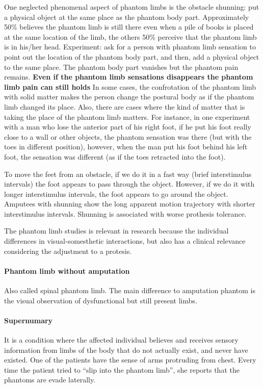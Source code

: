 \documentclass[12pt,article,oneside,a4paper]{memoir}
\begin{document}
One neglected phenomenal aspect of phantom limbs is the obstacle shunning: put
a physical object at the same place as the phantom body part. Approximately 50\%
believes the phantom limb is still there even when a pile of books is placed at
the same location of the limb, the others 50\% perceive that the phantom limb is
in his/her head. Experiment: ask for a person with phantom limb sensation to
point out the location of the phantom body part, and then, add a physical object
to the same place. The phantom body part vanishes but the phantom pain remains.
\textbf{Even if the phantom limb sensations disappears the phantom limb pain
can still holds} In some cases, the confrotation of the phantom limb with solid
matter makes the person change the postural body as if the phantom limb changed
its place. Also, there are cases where the kind of matter that is taking the
place of the phantom limb matters. For instance, in one experiment with a man
who lose the anterior part of his right foot, if he put his foot really close
to a wall or other objects, the phantom sensation was there (but with the toes
in different position), however, when the man put his foot behind his left foot,
the sensation was different (as if the toes retracted into the foot).

To move the feet from an obstacle, if we do it in a fast way (brief interstimulus
intervals) the foot appears to pass through the object. However, if we do it with
longer interstimulus intervals, the foot appears to go around the object.
Amputees with shunning show the long apparent motion trajectory with shorter
interstimulus intervals. Shunning is associated with worse prothesis tolerance.

The phantom limb studies is relevant in research because the individual
differences in visual-somesthetic interactions, but also has a clinical
relevance considering the adjustment to a protesis.

\paragraph{Phantom limb without amputation}
Also called spinal phantom limb. The main difference to amputation phantom is
the visual observation of dysfunctional but still present limbs. 

\paragraph{Supernumary}
It is a condition where the affected individual believes and receives sensory
information from limbs of the body that do not actually exist, and never have
existed. One of the patients have the sense of arms protruding from chest.
Every time the patient tried to ``slip into the phantom limb'', she reports
that the phantoms are evade laterally.
\end{document}
